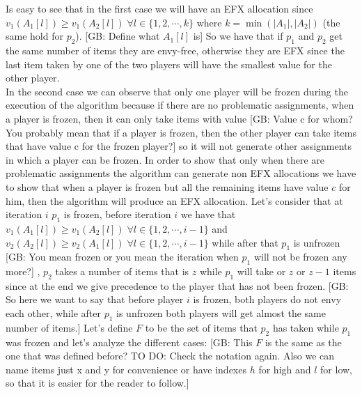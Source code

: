 \documentclass{article}
\newcommand{\gb}[1]{{\color{red}[GB: #1]}}
\begin{document}
Is easy to see that in the first case we will have an EFX allocation since $v_1(A_1[l])\ge v_1(A_2[l])\; \forall l \in \{1,2,\cdots,k\}$ where $k = \min (|A_1|, |A_2|)$ (the same hold for $p_2$).
\gb{Define what $A_1[l]$ is}
So we have that if $p_1$ and $p_2$ get the same number of items they are envy-free, otherwise they are EFX since the last item taken by one of the two players will have the smallest value for the other player.\\
In the second case we can observe that only one player will be frozen during the execution of the algorithm because if there are no problematic assignments, when a player is frozen, then it can only take items with value 
\gb{Value c for whom? You probably mean that if a player is frozen, then the other player can take items that have value c for the frozen player?}
so it will not generate other assignments in which a player can be frozen. In order to show that only when there are problematic assignments the algorithm can generate non EFX allocations we have to show that when a player is frozen but all the remaining items have value $c$ for him, then the algorithm will produce an EFX allocation.
Let's consider that at iteration $i$ $p_1$ is frozen, before iteration $i$ we have that $v_1(A_1[l])\ge v_1(A_2[l]) \; \forall l \in \{1,2,\cdots, i-1\}$ and $v_2(A_2[l]) \ge v_2(A_1[l])\;\forall l \in \{1,2,\cdots,i-1\}$ while after that $p_1$ is unfrozen
\gb{You mean frozen or you mean the iteration when $p_1$ will not be frozen any more?}
, $p_2$ takes a number of items that is $z$ while $p_1$ will take or $z$ or $z-1$ items since at the end we give precedence to the player that has not been frozen.
\gb{So here we want to say that before player $i$ is frozen, both players do not envy each other, while after $p_1$ is unfrozen both players will get almost the same number of items.}
Let's define $F$ to be the set of items that $p_2$ has taken while $p_1$ was frozen and let's analyze the different cases:
\gb{This $F$ is the same as the one that was defined before? TO DO: Check the notation again. Also we can name items just x and y for convenience or have indexes $h$ for high and $l$ for low, so that it is easier for the reader to follow.}
\end{document}
